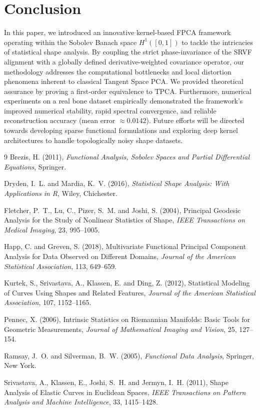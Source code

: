 \documentclass[twoside]{article}
\begin{document}
\section{Conclusion}

In this paper, we introduced an innovative kernel-based FPCA framework operating within the Sobolev Banach space $H^1([0,1])$ to tackle the intricacies of statistical shape analysis. By coupling the strict phase-invariance of the SRVF alignment with a globally defined derivative-weighted covariance operator, our methodology addresses the computational bottlenecks and local distortion phenomena inherent to classical Tangent Space PCA. We provided theoretical assurance by proving a first-order equivalence to TPCA. Furthermore, numerical experiments on a real bone dataset empirically demonstrated the framework's improved numerical stability, rapid spectral convergence, and reliable reconstruction accuracy (mean error $\approx 0.0142$). Future efforts will be directed towards developing sparse functional formulations and exploring deep kernel architectures to handle topologically noisy shape datasets.

\begin{thebibliography}{9}
Brezis, H. (2011), \textit{Functional Analysis, Sobolev Spaces and Partial Differential Equations}, Springer.

Dryden, I.~L. and Mardia, K.~V. (2016), \textit{Statistical Shape Analysis: With Applications in R}, Wiley, Chichester.

Fletcher, P.~T., Lu, C., Pizer, S.~M. and Joshi, S. (2004), Principal Geodesic Analysis for the Study of Nonlinear Statistics of Shape, \textit{IEEE Transactions on Medical Imaging}, 23, 995--1005.

Happ, C. and Greven, S. (2018), Multivariate Functional Principal Component Analysis for Data Observed on Different Domains, \textit{Journal of the American Statistical Association}, 113, 649--659.

Kurtek, S., Srivastava, A., Klassen, E. and Ding, Z. (2012), Statistical Modeling of Curves Using Shapes and Related Features, \textit{Journal of the American Statistical Association}, 107, 1152--1165.

Pennec, X. (2006), Intrinsic Statistics on Riemannian Manifolds: Basic Tools for Geometric Measurements,
\textit{Journal of Mathematical Imaging and Vision}, 25, 127--154.

Ramsay, J.~O. and Silverman, B.~W. (2005), \textit{Functional Data Analysis}, Springer, New York.

Srivastava, A., Klassen, E., Joshi, S.~H. and Jermyn, I.~H. (2011), Shape Analysis of Elastic Curves in Euclidean Spaces,
\textit{IEEE Transactions on Pattern Analysis and Machine Intelligence}, 33, 1415--1428.

\end{thebibliography}
\end{document}

